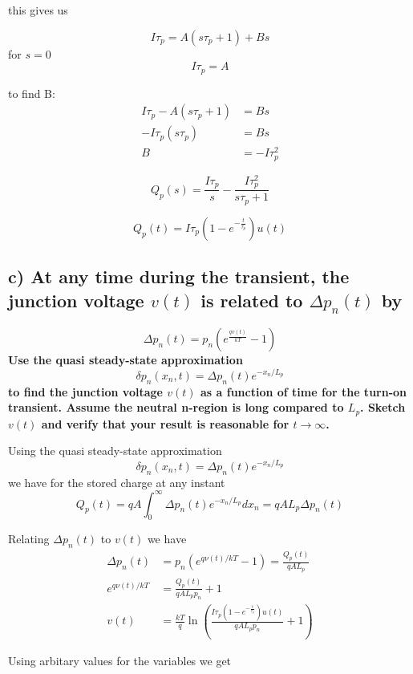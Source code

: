this gives us 

$$
I\tau_p=A\left(s\tau_p+1\right)+Bs
$$
for $s=0$
$$I\tau_p=A$$

to find B:
\begin{align*}
    I\tau_p-A\left(s\tau_p+1\right)&=Bs\\
    -I\tau_p\left(s\tau_p\right)&=Bs\\
    B&=-I\tau_p^2
\end{align*}

$$Q_p(s)=\frac{I\tau_p}{s}-\frac{I\tau_p^2}{s\tau_p+1}$$

$$Q_p(t)=I\tau_p \left(1-e^{-\frac{t}{\tau_p}}\right)u(t)$$



\subsection*{c) At any time during the transient, the junction voltage $v(t)$ is related to $\Delta p_n(t)$ by }
$$ \Delta p_n(t)=p_n\left(e^{\frac{q v(t)}{k T}}-1\right) $$
\textbf{Use the quasi steady-state approximation 
$$ \delta p_n\left(x_n, t\right)=\Delta p_n(t) e^{-x_n / L_p} $$
 to find the junction voltage $v(t)$ as a function of time for the turn-on transient. Assume the neutral n-region is long compared to $L_p$. Sketch $v(t)$ and verify that your result is reasonable for $t \rightarrow \infty$.}

Using the quasi steady-state approximation
$$ \delta p_n\left(x_n, t\right)=\Delta p_n(t) e^{-x_n / L_p} $$
we have for the stored charge at any instant
$$
Q_p(t)=q A \int_0^{\infty} \Delta p_n(t) e^{-x_n / L_p} d x_n=q A L_p \Delta p_n(t)
$$

Relating $\Delta p_n(t)$ to $v(t)$ we have
\begin{align*}
    \Delta p_n(t)&=p_n\left(e^{q \nu(t) / k T}-1\right)=\frac{Q_p(t)}{q A L_p}\\
    e^{q \nu(t) / k T}&=\frac{Q_p(t)}{q A L_pp_n}+1\\
    v(t)&=\frac{kT}{q}\ln \left(\frac{I\tau_p \left(1-e^{-\frac{t}{\tau_p}}\right)u(t)}{q A L_pp_n}+1\right)
\end{align*}

Using arbitary values for the variables we get

